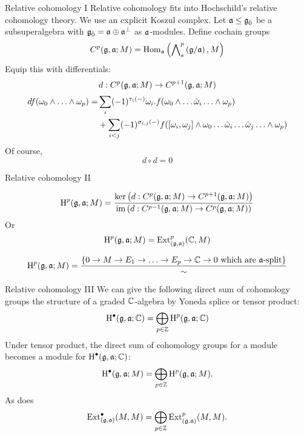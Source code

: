 \documentclass{beamer}
\begin{document}
\begin{frame}{Relative cohomology I}\pause
  Relative cohomology fits into Hochschild's relative cohomology theory. \pause We use an explicit Koszul complex. \pause Let $\mathfrak{a} \leq {\mathfrak{g}}_{\bar{0}}$ be a subsuperalgebra with ${\mathfrak{g}}_{\bar{0}} = \mathfrak{a} \oplus \mathfrak{a}^\perp$ as $\mathfrak{a}$-modules. Define cochain groups
  \[
    C^p(\mathfrak{g},\mathfrak{a};M) = \operatorname{Hom}_{\mathfrak{a}}\left(\bigwedge\nolimits^{p}_s\left( \mathfrak{g}/\mathfrak{a} \right), M \right)
  \]\pause
  Equip this with differentials:
  \[
    d: C^{p}(\mathfrak{g},\mathfrak{a};M) \to C^{p+1}(\mathfrak{g},\mathfrak{a};M)
  \]
  \begin{align*}
    df(\omega_0\wedge\ldots\wedge\omega_p) = &\sum_i (-1)^{\tau_i(-)} \omega_i . f(\omega_0 \wedge \ldots \hat {\omega}_i \ldots \wedge \omega_p) \\
    &+ \sum_{i < j} (-1)^{\sigma_{i,j}(-)} f([\omega_i,\omega_j]\wedge \omega_0 \ldots \hat {\omega}_i \ldots \hat {\omega}_j \ldots \wedge \omega_p)
  \end{align*}
  Of course,
  \[
    d \circ d = 0
  \]
\end{frame}

\begin{frame}{Relative cohomology II}\pause
  \begin{definition}
    \[
      \operatorname{H}^p(\mathfrak{g},\mathfrak{a};M) = \frac{\ker\left(d:C^p(\mathfrak{g},\mathfrak{a};M) \to C^{p+1}(\mathfrak{g},\mathfrak{a};M)\right)}{\operatorname{im}\left(d: C^{p-1}(\mathfrak{g},\mathfrak{a};M) \to C^p(\mathfrak{g},\mathfrak{a};M)\right)}
    \]
    \pause Or
    \[
      \operatorname{H}^p(\mathfrak{g},\mathfrak{a};M) = \operatorname{Ext}^p_{(\mathfrak{g},\mathfrak{a})}(\mathbb{C},M)
    \]
  \end{definition}\pause
  \[
    \operatorname{H}^p(\mathfrak{g},\mathfrak{a};M) = \frac{\left\{0 \to M \to E_1 \to \ldots \to E_p \to \mathbb{C} \to 0 \text{ which are $\mathfrak{a}$-split}\right\}}{\sim}
  \]
\end{frame}

\begin{frame}{Relative cohomology III}\pause
  We can give the following direct sum of cohomology groups the structure of a graded $\mathbb{C}$-algebra by Yoneda splice or tensor product:
  \[
    \operatorname{H}^\bullet(\mathfrak{g},\mathfrak{a};\mathbb{C}) = \bigoplus_{p \in \mathbb{Z}} \operatorname{H}^p(\mathfrak{g},\mathfrak{a};\mathbb{C})
  \]\pause
  Under tensor product, the direct sum of cohomology groups for a module becomes a module for $\operatorname{H}^\bullet(\mathfrak{g},\mathfrak{a};\mathbb{C})$:
  \[
    \operatorname{H}^\bullet(\mathfrak{g},\mathfrak{a};M) = \bigoplus_{p \in \mathbb{Z}} \operatorname{H}^p(\mathfrak{g},\mathfrak{a}; M).
  \]\pause
  As does
  \[
    \operatorname{Ext}^\bullet_{(\mathfrak{g},\mathfrak{a})}(M,M) = \bigoplus_{p \in \mathbb{Z}} \operatorname{Ext}^p_{(\mathfrak{g},\mathfrak{a})}(M, M).
  \]  
\end{frame}
\end{document}
